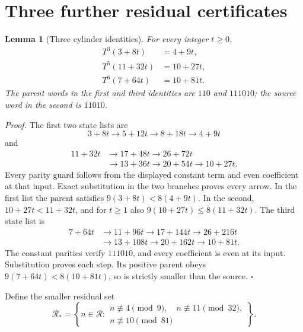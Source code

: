\documentclass[11pt,letterpaper]{article}
\newtheorem{lemma}[theorem]{Lemma}
\newenvironment{proof}{\noindent\textit{Proof.}}{\hfill\(\square\)}
\begin{document}
\section{Three further residual certificates}

\begin{lemma}[Three cylinder identities]
For every integer \(t\ge0\),
\[
\begin{aligned}
T^3(3+8t)&=4+9t,\\
T^5(11+32t)&=10+27t,\\
T^6(7+64t)&=10+81t.
\end{aligned}
\]
The parent words in the first and third identities are \(110\) and
\(111010\); the source word in the second is \(11010\).
\end{lemma}
\begin{proof}
The first two state lists are
\[
3+8t\to5+12t\to8+18t\to4+9t
\]
and
\[
\begin{aligned}
11+32t&\to17+48t\to26+72t\\
      &\to13+36t\to20+54t\to10+27t.
\end{aligned}
\]
Every parity guard follows from the displayed constant term and even
coefficient at that input. Exact substitution in the two branches proves
every arrow. In the first list the parent satisfies
\(9(3+8t)<8(4+9t)\). In the second,
\(10+27t<11+32t\), and for \(t\ge1\) also
\(9(10+27t)\le8(11+32t)\).
The third state list is
\[
\begin{aligned}
7+64t&\to11+96t\to17+144t\to26+216t\\
     &\to13+108t\to20+162t\to10+81t.
\end{aligned}
\]
The constant parities verify \(111010\), and every coefficient is even
at its input. Substitution proves each step. Its positive parent obeys
\(9(7+64t)<8(10+81t)\), so is strictly smaller than the source.
\end{proof}

Define the smaller residual set
\[
\mathcal R_*=
\left\{n\in\mathcal R:
\begin{array}{l}
n\not\equiv4\pmod9,\quad n\not\equiv11\pmod{32},\\
n\not\equiv10\pmod{81}
\end{array}\right\}.
\]
\end{document}
